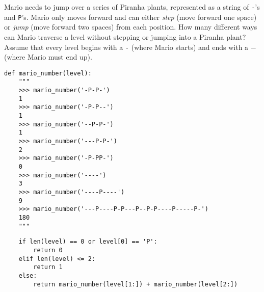 \begin{blocksection}
\question Mario needs to jump over a series of Piranha plants, represented as a
string of \lstinline$-$'s and \lstinline$P$'s. Mario only moves forward and can
either \emph{step} (move forward one space) or \emph{jump} (move forward two
spaces) from each position. How many different ways can Mario traverse a level
without stepping or jumping into a Piranha plant? Assume that every level begins
with a \lstinline$-$ (where Mario starts) and ends with a \lstinlne$-$ (where
Mario must end up).

\begin{lstlisting}
def mario_number(level):
    """
    >>> mario_number('-P-P-')
    1
    >>> mario_number('-P-P--')
    1
    >>> mario_number('--P-P-')
    1
    >>> mario_number('---P-P-')
    2
    >>> mario_number('-P-PP-')
    0
    >>> mario_number('----')
    3
    >>> mario_number('----P----')
    9
    >>> mario_number('---P----P-P---P--P-P----P-----P-')
    180
    """
\end{lstlisting}

\begin{solution}[1in]
\begin{lstlisting}
    if len(level) == 0 or level[0] == 'P':
        return 0
    elif len(level) <= 2:
        return 1
    else:
        return mario_number(level[1:]) + mario_number(level[2:])
\end{lstlisting}
\end{solution}
\end{blocksection}
